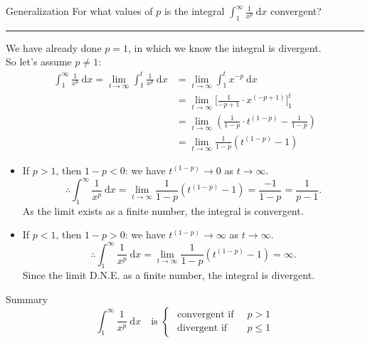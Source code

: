 \documentclass[12pt,a4paper]{article}
\def\d{{\mathrm{d}}}
\begin{document}
\begin{ext}{Generalization}
	For what values of $p$ is the integral $\displaystyle\int_1^\infty\frac{1}{x^p}\ \d x$ convergent? \\
	\noindent\rule[0.25\baselineskip]{\textwidth}{1pt}
	We have already done $p=1$, in which we know the integral is divergent.\\
	So let's assume $p\neq 1$: 
	$$\begin{aligned}
		\int_1^\infty\frac{1}{x^p}\ \d x=\lim_{t\to\infty}\int_1^t\frac{1}{x^p}\ \d x&=\lim_{t\to\infty}\int_1^t x^{-p}\ \d x\\
		&=\lim_{t\to\infty}\bigg[\frac{1}{-p+1}\cdot x^{(-p+1)}\bigg]^t_1\\
		&=\lim_{t\to\infty}\left(\frac{1}{1-p}\cdot t^{(1-p)}-\frac{1}{1-p}\right)\\
		&=\lim_{t\to\infty}\frac{1}{1-p}\left(t^{(1-p)}-1\right)
	\end{aligned}$$
	\begin{itemize}
		\item If $p>1$, then $1-p<0$: we have $t^{(1-p)}\to0$ as $t\to\infty$.
		$$\therefore \int_1^\infty\frac{1}{x^p}\ \d x=\lim_{t\to\infty}\frac{1}{1-p}\left(t^{(1-p)}-1\right)=\frac{-1}{1-p}=\frac{1}{p-1}.$$
		As the limit exists as a finite number, the integral is convergent. 
		\item If $p<1$, then $1-p>0$: we have $t^{(1-p)}\to\infty$ as $t\to\infty$.
		$$\therefore \int_1^\infty\frac{1}{x^p}\ \d x=\lim_{t\to\infty}\frac{1}{1-p}\left(t^{(1-p)}-1\right)=\infty.$$
		Since the limit D.N.E. as a finite number, the integral is divergent. 
	\end{itemize}
\end{ext}
\begin{rmk}{Summary}
	$$\int_1^\infty\frac{1}{x^p}\ \d x\quad\text{is }\begin{cases}\text{ convergent if }\ &p>1\\\text{ divergent if }\ &p\leq1\end{cases}$$
\end{rmk}
\end{document}
